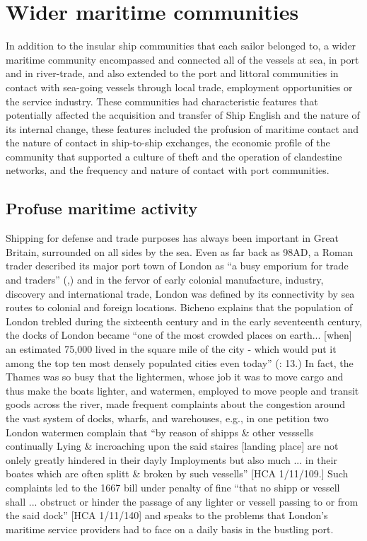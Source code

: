 \section{\textbf{Wider} \textbf{maritime} \textbf{communities}}%

In addition to the insular ship communities that each sailor belonged to, a wider maritime community encompassed and connected all of the vessels at sea, in port and in river-trade, and also extended to the port and littoral communities in contact with sea-going vessels through local trade, employment opportunities or the service industry. These communities had characteristic features that potentially affected the acquisition and transfer of Ship English and the nature of its internal change, these features included the profusion of maritime contact and the nature of contact in ship-to-ship exchanges, the economic profile of the community that supported a culture of theft and the operation of clandestine networks, and the frequency and nature of contact with port communities. 

\subsection{\textbf{Profuse} \textbf{maritime} \textbf{activity}}%

Shipping for defense and trade purposes has always been important in Great Britain, surrounded on all sides by the sea. Even as far back as 98AD, a Roman trader described its major port town of London as “a busy emporium for trade and traders” (\citealt{Tacitus1913},) and in the fervor of early colonial manufacture, industry, discovery and international trade, London was defined by its connectivity by sea routes to colonial and foreign locations. Bicheno explains that the population of London trebled during the sixteenth century and in the early seventeenth century, the docks of London became “one of the most crowded places on earth... [when] an estimated 75,000 lived in the square mile of the city - which would put it among the top ten most densely populated cities even today” (\citealt{Bicheno2012}: 13.) In fact, the Thames was so busy that the lightermen, whose job it was to move cargo and thus make the boats lighter, and watermen, employed to move people and transit goods across the river, made frequent complaints about the congestion around the vast system of docks, wharfs, and warehouses, e.g., in one petition two London watermen complain that “by reason of shipps \& other vesssells continually Lying \& incroaching upon the said staires [landing place] are not onlely greatly hindered in their dayly Imployments but also much ... in their boates which are often splitt \& broken by such vessells” [HCA 1/11/109.]  Such complaints led to the 1667 bill under penalty of fine “that no shipp or vessell shall ... obstruct or hinder the passage of any lighter or vessell passing to or from the said dock” [HCA 1/11/140] and speaks to the problems that London’s maritime service providers had to face on a daily basis in the bustling port. 

